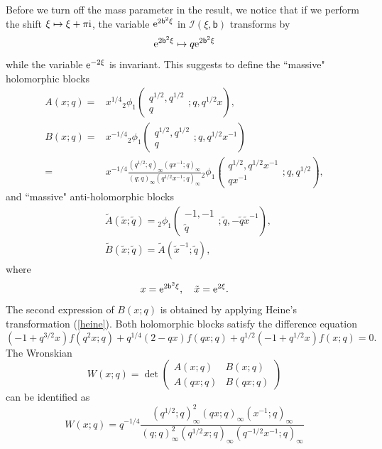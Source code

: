 \documentclass[a4paper,11pt]{article}
\theoremstyle{definition}
\newcommand{\re}{{\rm e}}
\newcommand{\ri}{{\rm i}}
\def\tq{{\tilde{q}}}
\def\tx{{\tilde{x}}}
\newcommand{\bb}{\mathsf{b}}
\newcommand{\wt}[1]{\widetilde{#1}}
\def\mc{\mathcal}
\newcommand{\qhg}[6]{{}_#1\phi_{#2}
  \left(\begin{matrix}
    #3  \\
    #4
  \end{matrix} ; #5, #6\right)}
\begin{document}
Before we turn off the mass parameter in the result, we notice that if
we perform the shift $\xi \mapsto \xi+\pi\ri$, the variable $\re^{2\bb^2\xi}$ in $\mc{I}(\xi,\bb)$ transforms by
\begin{equation}
  \re^{2\bb^2\xi} \mapsto q \re^{2\bb^2\xi}
\end{equation}
while the variable $\re^{-2\xi}$ is invariant. This suggests 
to define the ``massive" holomorphic blocks
%
\begin{subequations}
  \begin{align}
    A(x;q) =
    &x^{1/4}\qhg{2}{1}{q^{1/2},q^{1/2}}{q}{q}{q^{1/2}x},
    \label{eq:Axq}\\
    B(x;q) =
    &x^{-1/4}\qhg{2}{1}{q^{1/2},q^{1/2}}{q}{q}{q^{1/2}x^{-1}}\\ =
    &x^{-1/4}\frac{(q^{1/2};q)_\infty(q x^{-1};q)_\infty}
      {(q;q)_\infty(q^{1/2}x^{-1};q)_\infty}
      \qhg{2}{1}{q^{1/2},q^{1/2}x^{-1}}{qx^{-1}}{q}{q^{1/2}},
      \label{eq:Bxq}
  \end{align}
\end{subequations}
and ``massive" anti-holomorphic blocks
\begin{subequations}
  \begin{align}
    &\wt{A}(\tx;\tq) = \qhg{2}{1}{-1,-1}{\tq}{\tq}{-\tq\tx^{-1}},\\
    &\wt{B}(\tx;\tq) = \wt{A}(\tx^{-1};\tq),
  \end{align}
\end{subequations}
where
\begin{equation}
  x = \re^{2\bb^2\xi},\quad \tx = \re^{2\xi}.
\end{equation}
The second expression of $B(x;q)$ is obtained by applying Heine's
transformation (\ref{heine}). Both holomorphic blocks satisfy the difference
equation
\begin{equation}
  (-1+q^{3/2}x)f(q^2x;q) +q^{1/4}(2-qx)f(qx;q) +
  q^{1/2}(-1+q^{1/2}x)f(x;q) = 0.
\end{equation}
The Wronskian
\begin{equation}
  W(x;q) =
  \det\begin{pmatrix}
    A(x;q) & B(x;q) \\
    A(qx;q) & B(qx;q)
  \end{pmatrix}
\end{equation}
can be identified as
\begin{equation}
  W(x;q) = q^{-1/4}
  \frac{(q^{1/2};q)_\infty^2(qx;q)_\infty(x^{-1};q)_\infty}
  {(q;q)_\infty^2(q^{1/2}x;q)_\infty(q^{-1/2}x^{-1};q)_\infty}
  \label{eq:W-F0}
\end{equation}
\end{document}
